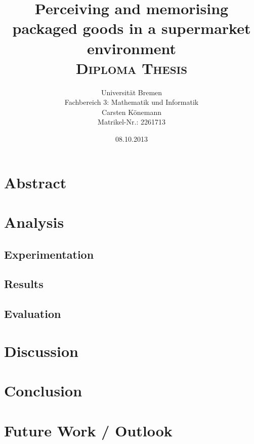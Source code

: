 \documentclass[11pt, twoside, a4paper]{report}
\begin{document}
  \title{\textbf{Perceiving and memorising packaged goods in a supermarket environment} \vspace{7.5mm} \\ \textsc{Diploma Thesis}}
  \author{Universit\"at Bremen \\ Fachbereich 3: Mathematik und Informatik \vspace{3.5mm} \\ Carsten K\"onemann \\ Matrikel-Nr.: 2261713}
  \date{08.10.2013}

  \maketitle

  \chapter*{Abstract}

  \tableofcontents

  

  

  

  \chapter{Analysis}
  \section{Experimentation}
  \section{Results}
  \section{Evaluation}

  \chapter{Discussion}

  \chapter{Conclusion}

  \chapter{Future Work / Outlook}
\end{document}
